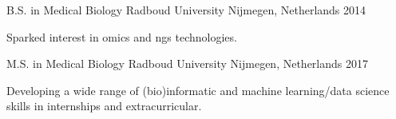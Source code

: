 

\begin{cventries}

  \cventry
    {B.S. in Medical Biology} %
    {Radboud University} %
    {Nijmegen, Netherlands} %
    {2014} %
    {
      \begin{cvitems} %
        \item {Sparked interest in omics and ngs technologies.}
      \end{cvitems}
    }

  \cventry
    {M.S. in Medical Biology} %
    {Radboud University} %
    {Nijmegen, Netherlands} %
    {2017} %
    {
      \begin{cvitems} %
        \item {Developing a wide range of (bio)informatic and machine learning/data science skills in internships and extracurricular.}
      \end{cvitems}
    }


\end{cventries}